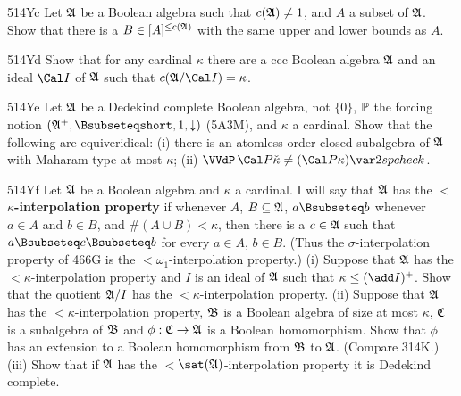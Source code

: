 {\spheader 514Yc Let $\frak A$ be a Boolean algebra such that
$c(\frak A)\ne 1$, and $A$ a subset of $\frak A$.   
Show that there is a $B\in[A]^{\le c(\frak A)}$
with the same upper and lower bounds as $A$.

\spheader 514Yd Show that for any cardinal $\kappa$ there are a ccc
Boolean algebra $\frak A$ and an ideal $\Cal I$ of $\frak A$ such that
$c(\frak A/\Cal I)=\kappa$.

\spheader 514Ye Let $\frak A$ be a Dedekind complete Boolean algebra, not
$\{0\}$, $\Bbb P$ the forcing notion
$(\frak A^+,\Bsubseteqshort,1,\downarrow)$ (5A3M), and $\kappa$ a cardinal.
Show that the following are equiveridical:  (i) there is an
atomless order-closed subalgebra of $\frak A$ with Maharam type at most
$\kappa$;  (ii)
$\VVdP\,\Cal P\check\kappa\ne(\Cal P\kappa)\var2spcheck$.

\spheader 514Yf Let $\frak A$ be a Boolean algebra and $\kappa$ a
cardinal.   I will say that $\frak A$ has the 
{\bf\hbox{$<$}$\kappa$-interpolation property}
if whenever $A$, $B\subseteq\frak A$, $a\Bsubseteq b$ whenever $a\in A$ and
$b\in B$, and $\#(A\cup B)<\kappa$, then there is a $c\in\frak A$ such that
$a\Bsubseteq c\Bsubseteq b$ for every $a\in A$, $b\in B$.
(Thus the $\sigma$-interpolation property of 466G is the
{\bf\hbox{$<$}$\omega_1$}-interpolation property.)
(i) Suppose that $\frak A$ has the \hbox{$<$}$\kappa$-interpolation
property and $I$ is an ideal of $\frak A$ such that $\kappa\le(\add I)^+$.
Show that the quotient $\frak A/I$ has the 
\hbox{$<$}$\kappa$-interpolation property.
(ii) Suppose that $\frak A$ has the \hbox{$<$}$\kappa$-interpolation
property,
$\frak B$ is a Boolean algebra of size at most $\kappa$, $\frak C$ is a
subalgebra of $\frak B$ and $\phi:\frak C\to\frak A$ is a
Boolean homomorphism.
Show that $\phi$ has an extension to a Boolean homomorphism from $\frak B$ to
$\frak A$.   (Compare 314K.)
(iii) Show that if $\frak A$ has the
\hbox{$<$}$\sat(\frak A)$-interpolation property it is Dedekind complete.
}%

